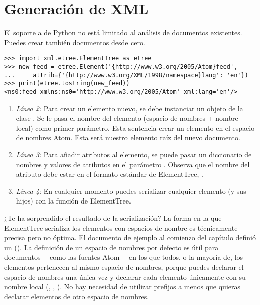 \section{Generación de XML}

El soporte a  de Python no está limitado al análisis de documentos existentes. Puedes crear también documentos  desde cero.

\noindent\begin{minipage}{\textwidth}
\begin{lstlisting}[mathescape=True]
>>> import xml.etree.ElementTree as etree
>>> new_feed = etree.Element('{http://www.w3.org/2005/Atom}feed',
...     attrib={'{http://www.w3.org/XML/1998/namespace}lang': 'en'})
>>> print(etree.tostring(new_feed))
<ns0:feed xmlns:ns0='http://www.w3.org/2005/Atom' xml:lang='en'/>
\end{lstlisting}
\end{minipage}

\begin{enumerate}

\item \emph{Línea 2:} Para crear un elemento nuevo, se debe instanciar un objeto de la clase . Se le pasa el nombre del elemento (espacio de nombres + nombre local) como primer parámetro. Esta sentencia crear un elemento  en el espacio de nombres Atom. Esta será nuestro elemento raíz del nuevo documento.

\item \emph{Línea 3:} Para añadir atributos al elemento, se puede pasar un diccionario de nombres y valores de atributos en el parámetro . Observa que el nombre del atributo debe estar en el formato estándar de ElementTree, .

\item \emph{Línea 4:} En cualquier momento puedes serializar cualquier elemento (y sus hijos) con la función  de ElementTree.

\end{enumerate}

¿Te ha sorprendido el resultado de la serialización? La forma en la que ElementTree serializa los elementos con espacios de nombre  es técnicamente precisa pero no óptima. El documento  de ejemplo al comienzo del capítulo definió un  (). La definición de un espacio de nombres por defecto es útil para documentos ---como las fuentes Atom--- en los que todos, o la mayoría de, los elementos pertenecen al mismo espacio de nombres, porque puedes declarar el espacio de nombres una única vez y declarar cada elemento únicamente con su nombre local (, , ). No hay necesidad de utilizar prefijos a menos que quieras declarar elementos de otro espacio de nombres.

